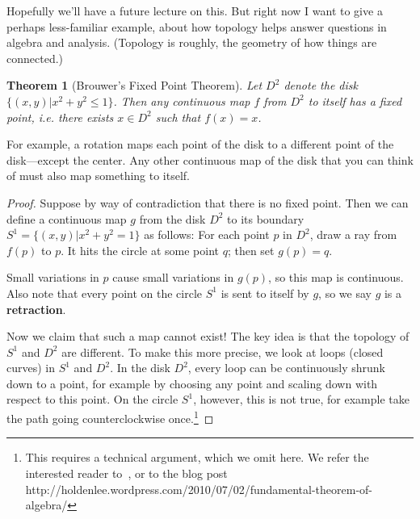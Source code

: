 \documentclass[12pt,twoside]{article}
\theoremstyle{norm}
\newtheorem{thm}{Theorem}[section]
\begin{document}
Hopefully we'll have a future lecture on this. But right now I want to give a perhaps less-familiar example, about how topology helps answer questions in algebra and analysis. (Topology is roughly, the geometry of how things are connected.)
\begin{thm}[Brouwer's Fixed Point Theorem]
Let $D^2$ denote the disk $\{(x,y)|x^2+y^2\leq 1\}$. Then any continuous map $f$ from $D^2$ to itself has a fixed point, i.e. there exists $x\in D^2$ such that $f(x)=x$.
\end{thm}
For example, a rotation maps each point of the disk to a different point of the disk---except the center. Any other continuous map of the disk that you can think of must also map something to itself.
\begin{proof}
Suppose by way of contradiction that there is no fixed point. Then we can define a continuous map $g$ from the disk $D^2$ to its boundary $S^1=\{(x,y)|x^2+y^2=1\}$ as follows: For each point $p$ in $D^2$, draw a ray from $f(p)$ to $p$. It hits the circle at some point $q$; then set $g(p)=q$. 

\begin{figure}[h!]
\end{figure}

Small variations in $p$ cause small variations in $g(p)$, so this map is continuous. Also note that every point on the circle $S^1$ is sent to itself by $g$, so we say $g$ is a \textbf{retraction}.

Now we claim that such a map cannot exist! The key idea is that the topology of $S^1$ and $D^2$ are different. To make this more precise, we look at loops (closed curves) in $S^1$ and $D^2$. In the disk $D^2$, every loop can be continuously shrunk down to a point, for example by choosing any point and scaling down with respect to this point. On the circle $S^1$, however, this is not true, for example take the path going counterclockwise once.\footnote{This requires a technical argument, which we omit here. We refer the interested reader to~\cite{Hat}, or to the blog post http://holdenlee.wordpress.com/2010/07/02/fundamental-theorem-of-algebra/} 


\end{proof}
\end{document}
